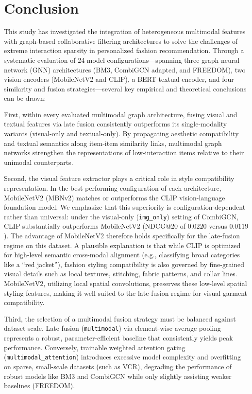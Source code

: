 \section{Conclusion}

This study has investigated the integration of heterogeneous multimodal features with graph-based collaborative filtering architectures to solve the challenges of extreme interaction sparsity in personalized fashion recommendation. Through a systematic evaluation of 24 model configurations—spanning three graph neural network (GNN) architectures (BM3, CombiGCN adapted, and FREEDOM), two vision encoders (MobileNetV2 and CLIP), a BERT textual encoder, and four similarity and fusion strategies—several key empirical and theoretical conclusions can be drawn:

First, within every evaluated multimodal graph architecture, fusing visual and textual features via late fusion consistently outperforms its single-modality variants (visual-only and textual-only). By propagating aesthetic compatibility and textual semantics along item-item similarity links, multimodal graph networks strengthen the representations of low-interaction items relative to their unimodal counterparts.

Second, the visual feature extractor plays a critical role in style compatibility representation. In the best-performing configuration of each architecture, MobileNetV2 (MBNv2) matches or outperforms the CLIP vision-language foundation model. We emphasize that this superiority is configuration-dependent rather than universal: under the visual-only (\texttt{img\_only}) setting of CombiGCN, CLIP substantially outperforms MobileNetV2 (NDCG@20 of $0.0220$ versus $0.0119$). The advantage of MobileNetV2 therefore holds specifically for the late-fusion regime on this dataset. A plausible explanation is that while CLIP is optimized for high-level semantic cross-modal alignment (e.g., classifying broad categories like a ``red jacket''), fashion styling compatibility is also governed by fine-grained visual details such as local textures, stitching, fabric patterns, and collar lines. MobileNetV2, utilizing local spatial convolutions, preserves these low-level spatial styling features, making it well suited to the late-fusion regime for visual garment compatibility.

Third, the selection of a multimodal fusion strategy must be balanced against dataset scale. Late fusion (\texttt{multimodal}) via element-wise average pooling represents a robust, parameter-efficient baseline that consistently yields peak performance. Conversely, trainable weighted attention gating (\texttt{multimodal\_attention}) introduces excessive model complexity and overfitting on sparse, small-scale datasets (such as VCR), degrading the performance of robust models like BM3 and CombiGCN while only slightly assisting weaker baselines (FREEDOM).

